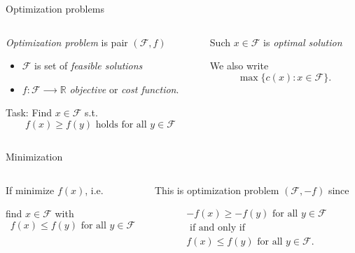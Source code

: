 \begin{frame}{Optimization problems}

    \begin{columns}
      \begin{column}{.5\textwidth}
        \emph{Optimization problem}  is pair $(ℱ,f)$

        \medskip 

        \begin{itemize}
        \item $ℱ$ is set of \emph{feasible solutions}
        \item $f: ℱ ⟶ ℝ$  \emph{objective} or \emph{cost function}.
        \end{itemize}

        \bigskip
        
Task: Find  $x ∈ ℱ$ s.t. 
\begin{displaymath}
  f(x) ≥ f(y) \text{ holds for all } y ∈ ℱ 
\end{displaymath}
      \end{column}
      \begin{column}{.5\textwidth}
        Such  $x∈ ℱ$  is  \emph{optimal solution}

        \bigskip 
        We also write 
\begin{displaymath}
  \max \{ c(x) : x ∈ ℱ\}. 
\end{displaymath}
      \end{column}       
    \end{columns}
  \end{frame}


  \begin{frame}{Minimization}

    \begin{columns}[t]
      \begin{column}[t]{.5\textwidth}
        If  minimize $f(x)$, i.e.

        \bigskip 
        find  $x ∈ ℱ$ with  
\begin{displaymath}
  f(x) ≤ f(y) \text{ for all } y ∈ ℱ 
\end{displaymath}
        
      \end{column}
      \begin{column}{.5\textwidth}
        This is optimization problem $(ℱ,-f)$ since


        \bigskip

        \begin{displaymath}
          \begin{array}{l}
            -f(x) ≥ - f(y) \text{ for all } y ∈ ℱ \\[1ex] \text{ if and only if } \\[1ex] f(x) ≤ f(y) \text{ for all } y ∈ ℱ.
          \end{array}
        \end{displaymath}
      \end{column}       
    \end{columns}
  \end{frame}

